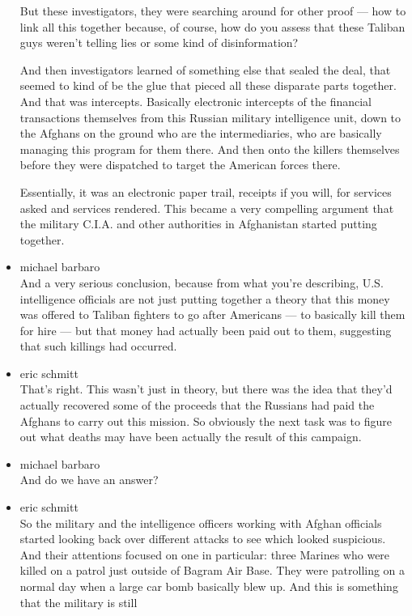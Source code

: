 \begin{itemize}
  But these investigators, they were searching around for other proof
  --- how to link all this together because, of course, how do you
  assess that these Taliban guys weren't telling lies or some kind of
  disinformation?

  And then investigators learned of something else that sealed the deal,
  that seemed to kind of be the glue that pieced all these disparate
  parts together. And that was intercepts. Basically electronic
  intercepts of the financial transactions themselves from this Russian
  military intelligence unit, down to the Afghans on the ground who are
  the intermediaries, who are basically managing this program for them
  there. And then onto the killers themselves before they were
  dispatched to target the American forces there.

  Essentially, it was an electronic paper trail, receipts if you will,
  for services asked and services rendered. This became a very
  compelling argument that the military C.I.A. and other authorities in
  Afghanistan started putting together.
\item
  michael barbaro\\
  And a very serious conclusion, because from what you're describing,
  U.S. intelligence officials are not just putting together a theory
  that this money was offered to Taliban fighters to go after Americans
  --- to basically kill them for hire --- but that money had actually
  been paid out to them, suggesting that such killings had occurred.
\item
  eric schmitt\\
  That's right. This wasn't just in theory, but there was the idea that
  they'd actually recovered some of the proceeds that the Russians had
  paid the Afghans to carry out this mission. So obviously the next task
  was to figure out what deaths may have been actually the result of
  this campaign.
\item
  michael barbaro\\
  And do we have an answer?
\item
  eric schmitt\\
  So the military and the intelligence officers working with Afghan
  officials started looking back over different attacks to see which
  looked suspicious. And their attentions focused on one in particular:
  three Marines who were killed on a patrol just outside of Bagram Air
  Base. They were patrolling on a normal day when a large car bomb
  basically blew up. And this is something that the military is still

\end{itemize}

